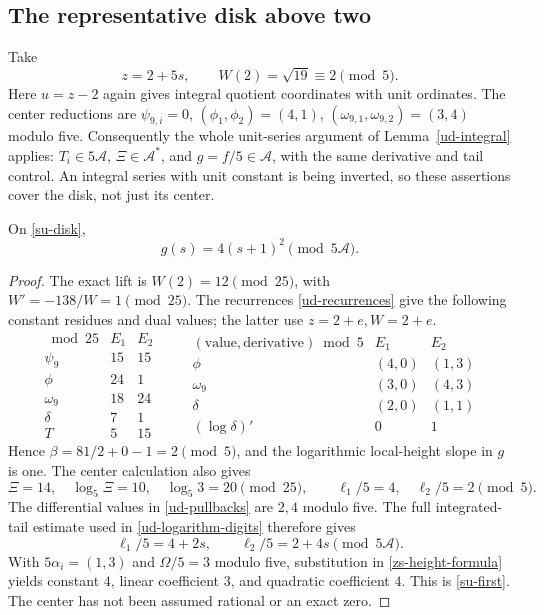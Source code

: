 \subsection{The representative disk above two}

Take
\begin{equation}
 z=2+5s,\qquad W(2)=\sqrt{19}\equiv2\pmod5.
 \label{su-disk}
\end{equation}
Here \(u=z-2\) again gives integral quotient coordinates with unit
ordinates. The center reductions are
\(\psi_{9,i}=0\), \((\phi_1,\phi_2)=(4,1)\),
\((\omega_{9,1},\omega_{9,2})=(3,4)\) modulo five.
Consequently the whole unit-series argument of Lemma~\ref{ud-integral}
applies: \(T_i\in5\mathcal A\), \(\Xi\in\mathcal A^*\),
and \(g=f/5\in\mathcal A\), with the same derivative and tail control.
An integral series with unit constant is being inverted, so these
assertions cover the disk, not just its center.

\begin{lemma}
\label{su-reduction}
On \eqref{su-disk},
\begin{equation}
 g(s)=4(s+1)^2\pmod{5\mathcal A}.
 \label{su-first}
\end{equation}
\end{lemma}
\begin{proof}
The exact lift is \(W(2)=12\pmod{25}\), with
\(W'=-138/W=1\pmod{25}\). The recurrences
\eqref{ud-recurrences} give the following constant residues and dual
values; the latter use \(z=2+e,W=2+e\).
\[
\begin{array}{c|cc}
 \bmod25&E_1&E_2\\\hline
 \psi_9&15&15\\\phi&24&1\\\omega_9&18&24\\
 \delta&7&1\\T&5&15
\end{array}
\qquad
\begin{array}{c|cc}
 (\text{value},\text{derivative})\bmod5&E_1&E_2\\\hline
 \phi&(4,0)&(1,3)\\\omega_9&(3,0)&(4,3)\\
 \delta&(2,0)&(1,1)\\(\log\delta)'&0&1
\end{array}
\]
Hence \(\beta=81/2+0-1=2\pmod5\), and the logarithmic local-height
slope in \(g\) is one. The center calculation also gives
\[
 \Xi=14,\quad\log_5\Xi=10,\quad\log_5 3=20\pmod{25},
 \qquad \ell_1/5=4,\quad\ell_2/5=2\pmod5.
\]
The differential values in \eqref{ud-pullbacks} are \(2,4\) modulo
five. The full integrated-tail estimate used in
\eqref{ud-logarithm-digits} therefore gives
\[
 \ell_1/5=4+2s,\qquad\ell_2/5=2+4s\pmod{5\mathcal A}.
\]
With \(5\alpha_i=(1,3)\) and \(\Omega/5=3\) modulo five,
substitution in \eqref{zs-height-formula} yields constant \(4\),
linear coefficient \(3\), and quadratic coefficient \(4\).
This is \eqref{su-first}. The center has not been assumed rational
or an exact zero.
\end{proof}

